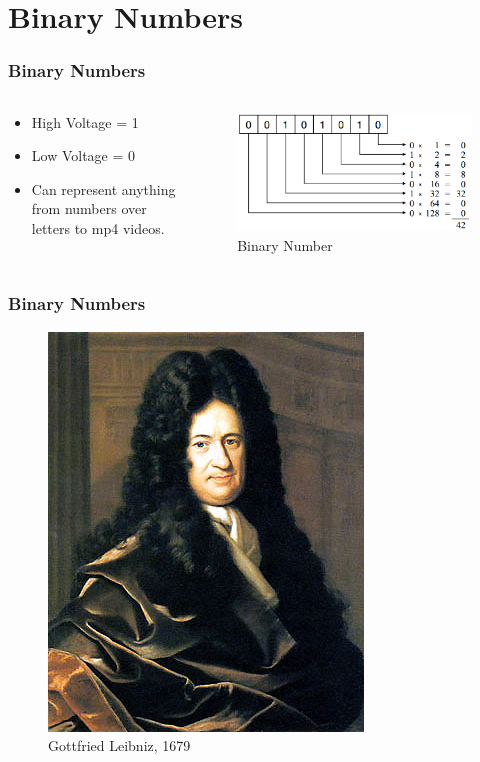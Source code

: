 \documentclass{beamer}
\begin{document}
\section{Binary Numbers}
\begin{frame}\frametitle{Binary Numbers}
  \begin{columns}
  \begin{column}{6cm}
  \begin{itemize}
   \item High Voltage = 1
   \item Low Voltage = 0
   \item Can represent anything from numbers over letters to mp4 videos.
  \end{itemize}

  \end{column}
  \begin{column}{6cm}
  \begin{figure}
  \includegraphics[width=1\textwidth]{binary}
  \caption{Binary Number}
  \end{figure}
  \end{column}
  \end{columns}
\end{frame}


\begin{frame}\frametitle{Binary Numbers}
  \begin{figure}
  \includegraphics[height=0.7\textheight]{leibniz}
  \caption{Gottfried Leibniz, 1679}
  \end{figure}
\end{frame}
\end{document}
